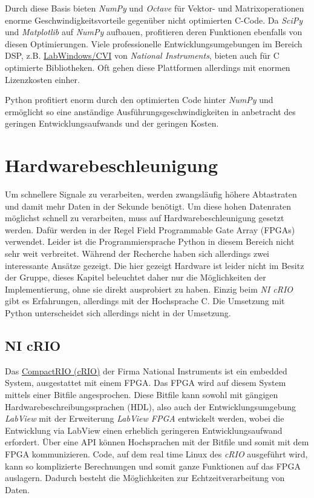 \documentclass[11pt]{article}
\begin{document}
Durch diese Basis bieten \emph{NumPy} und \emph{Octave} für Vektor- und
Matrixoperationen enorme Geschwindigkeitsvorteile gegenüber nicht
optimierten C-Code. Da \emph{SciPy} und \emph{Matplotlib} auf
\emph{NumPy} aufbauen, profitieren deren Funktionen ebenfalls von diesen
Optimierungen. Viele professionelle Entwicklungsumgebungen im Bereich
DSP, z.B.
\href{https://www.ni.com/en-us/shop/electronic-test-instrumentation/programming-environments-for-electronic-test-and-instrumentation/what-is-labwindows-cvi.html}{LabWindows/CVI}
von \emph{National Instruments}, bieten auch für C optimierte
Bibliotheken. Oft gehen diese Plattformen allerdings mit enormen
Lizenzkosten einher.

Python profitiert enorm durch den optimierten Code hinter \emph{NumPy}
und ermöglicht so eine anständige Ausführungsgeschwindigkeiten in
anbetracht des geringen Entwicklungsaufwands und der geringen Kosten.

    \hypertarget{hardwarebeschleunigung}{%
\section{Hardwarebeschleunigung}\label{hardwarebeschleunigung}}

Um schnellere Signale zu verarbeiten, werden zwangsläufig höhere
Abtastraten und damit mehr Daten in der Sekunde benötigt. Um diese hohen
Datenraten möglichst schnell zu verarbeiten, muss auf
Hardwarebeschleunigung gesetzt werden. Dafür werden in der Regel Field
Programmable Gate Array (FPGAs) verwendet. Leider ist die
Programmiersprache Python in diesem Bereich nicht sehr weit verbreitet.
Während der Recherche haben sich allerdings zwei interessante Ansätze
gezeigt. Die hier gezeigt Hardware ist leider nicht im Besitz der
Gruppe, dieses Kapitel beleuchtet daher nur die Möglichkeiten der
Implementierung, ohne sie direkt ausprobiert zu haben. Einzig beim
\emph{NI cRIO} gibt es Erfahrungen, allerdings mit der Hochsprache C.
Die Umsetzung mit Python unterscheidet sich allerdings nicht in der
Umsetzung.

\hypertarget{ni-crio}{%
\subsection{NI cRIO}\label{ni-crio}}

Das \href{https://www.ni.com/de-de/shop/compactrio.html}{CompactRIO
(cRIO)} der Firma National Instruments ist ein embedded System,
ausgestattet mit einem FPGA. Das FPGA wird auf diesem System mittels
einer Bitfile angesprochen. Diese Bitfile kann sowohl mit gängigen
Hardwarebeschreibungssprachen (HDL), also auch der Entwicklungsumgebung
\emph{LabView} mit der Erweiterung \emph{LabView FPGA} entwickelt
werden, wobei die Entwicklung via LabView einen erheblich geringeren
Entwicklungsaufwand erfordert. Über eine API können Hochsprachen mit der
Bitfile und somit mit dem FPGA kommunizieren. Code, auf dem real time
Linux des \emph{cRIO} ausgeführt wird, kann so komplizierte Berechnungen
und somit ganze Funktionen auf das FPGA auslagern. Dadurch besteht die
Möglichkeiten zur Echtzeitverarbeitung von Daten.
\end{document}
